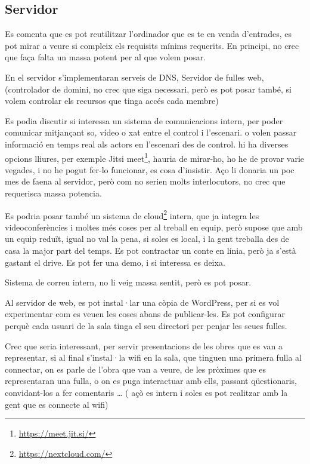 \documentclass[
  10pt,
]{krantz}
\DeclareRobustCommand{\href}[2]{#2\footnote{\url{#1}}}
\begin{document}
\hypertarget{servidor}{%
\subsection{Servidor}\label{servidor}}

Es comenta que es pot reutilitzar l'ordinador que es te en venda d'entrades, es pot mirar a veure si compleix els requisits mínims requerits. En principi, no crec que faça falta un massa potent per al que volem posar.

En el servidor s'implementaran serveis de DNS, Servidor de fulles web, (controlador de domini, no crec que siga necessari, però es pot posar també, si volem controlar els recursos que tinga accés cada membre)

Es podia discutir si interessa un sistema de comunicacions intern, per poder comunicar mitjançant so, vídeo o xat entre el control i l'escenari. o volen passar informació en temps real als actors en l'escenari des de control. hi ha diverses opcions lliures, per exemple \href{https://meet.jit.si/}{Jitsi meet}, hauria de mirar-ho, ho he de provar varie vegades, i no he pogut fer-lo funcionar, es cosa d'insistir. Aço li donaria un poc mes de faena al servidor, però com no serien molts interlocutors, no crec que requerisca massa potencia.

Es podria posar també un sistema de \href{https://nextcloud.com/}{cloud} intern, que ja integra les videoconferències i moltes més coses per al treball en equip, però supose que amb un equip reduït, igual no val la pena, si soles es local, i la gent treballa des de casa la major part del temps. Es pot contractar un conte en línia, però ja s'està gastant el drive. Es pot fer una demo, i si interessa es deixa.

Sistema de correu intern, no li veig massa sentit, però es pot posar.

Al servidor de web, es pot instal·lar una còpia de WordPress, per si es vol experimentar com es veuen les coses abans de publicar-les. Es pot configurar perquè cada usuari de la sala tinga el seu directori per penjar les seues fulles.

Crec que seria interessant, per servir presentacions de les obres que es van a representar, si al final s'instal·la wifi en la sala, que tinguen una primera fulla al connectar, on es parle de l'obra que van a veure, de les pròximes que es representaran una fulla, o on es puga interactuar amb ells, passant qüestionaris, convidant-los a fer comentaris \ldots{} ( açò es intern i soles es pot realitzar amb la gent que es connecte al wifi)
\end{document}
